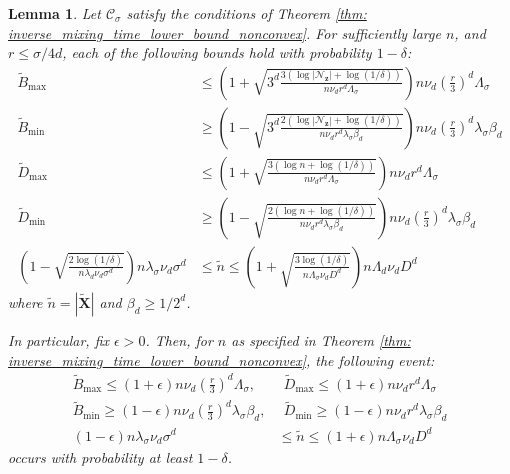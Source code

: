 \documentclass{article}
\newcommand{\abs}[1]{\left \lvert #1 \right \rvert}
\newcommand{\1}{\mathbf{1}}
\newcommand{\zbf}{\mathbf{z}}
\newcommand{\Xbf}{\mathbf{X}}
\newcommand{\Cset}{\mathcal{C}}
\newcommand{\Csig}{\Cset_{\sigma}}
\newcommand{\wn}{\widetilde{n}}
\newcommand{\wX}{\widetilde{\Xbf}}
\theoremstyle{aldenthm}
\newtheorem{lemma}{Lemma}
\begin{document}
\begin{lemma}
	\label{lem: ball_bounds}
	Let $\Csig$ satisfy the conditions of Theorem \ref{thm: inverse_mixing_time_lower_bound_nonconvex}.	For sufficiently large $n$, and $r \leq \sigma/4d$, each of the following bounds hold with probability $1 - \delta$:
	\begin{align}
	\label{eqn: ball_bounds}
	\widetilde{B}_{\max} & \leq \left(1 + \sqrt{3^d\frac{3(\log \abs{\mathcal{N}_{\zbf}} + \log(1/\delta))}{n \nu_d r^d \Lambda_{\sigma}}}\right) n \nu_d \left(\frac{r}{3}\right)^d \Lambda_{\sigma} \nonumber \\
	\widetilde{B}_{\min} & \geq \left(1 - \sqrt{3^d\frac{2(\log \abs{\mathcal{N}_{\zbf}} + \log(1/\delta))}{n \nu_d r^d \lambda_{\sigma} \beta_d}}\right) n \nu_d \left(\frac{r}{3}\right)^d \lambda_{\sigma} \beta_d \nonumber \\
	\widetilde{D}_{\max} & \leq \left(1 + \sqrt{\frac{3(\log n + \log(1/\delta))}{n \nu_d r^d \Lambda_{\sigma}}}\right) n \nu_d r^d \Lambda_{\sigma} \nonumber \\
	\widetilde{D}_{\min} & \geq \left(1 - \sqrt{\frac{2(\log n + \log(1/\delta))}{n \nu_d r^d \lambda_{\sigma} \beta_d}}\right) n \nu_d \left(\frac{r}{3}\right)^d \lambda_{\sigma} \beta_d \nonumber \\
	\left(1 - \sqrt{\frac{2 \log(1/\delta)}{n \lambda_d \nu_d \sigma^d}}\right) n \lambda_{\sigma} \nu_d \sigma^d & \leq \widetilde{n} \leq \left(1 + \sqrt{\frac{3 \log(1/\delta)}{n \Lambda_{\sigma} \nu_d D^d}}\right) n \Lambda_d \nu_d D^d
	\end{align}
	where $\wn = \abs{\wX}$ and $\beta_d \geq 1/2^d$.
	
	In particular, fix $\epsilon > 0$. Then, for $n$ as specified in Theorem \ref{thm: inverse_mixing_time_lower_bound_nonconvex}, the following event:
	\begin{align}
	\label{eqn: ball_bounds_epsilon}
	\widetilde{B}_{\max} \leq \left(1 + \epsilon \right) n \nu_d \left(\frac{r}{3}\right)^d \Lambda_{\sigma},& ~~ \widetilde{D}_{\max} \leq \left(1 + \epsilon \right) n \nu_d r^d \Lambda_{\sigma} \nonumber \\
	\widetilde{B}_{\min} \geq \left(1 - \epsilon \right) n \nu_d \left(\frac{r}{3}\right)^d \lambda_{\sigma} \beta_{d},& ~~ \widetilde{D}_{\min} \geq \left(1 - \epsilon \right) n \nu_d r^d \lambda_{\sigma} \beta_{d} \nonumber \\
	(1 - \epsilon) n \lambda_{\sigma} \nu_d \sigma^d & \leq \widetilde{n} \leq (1 + \epsilon) n \Lambda_{\sigma} \nu_d D^d 
	\end{align}
	occurs with probability at least $1 - \delta$.
\end{lemma}
\end{document}
